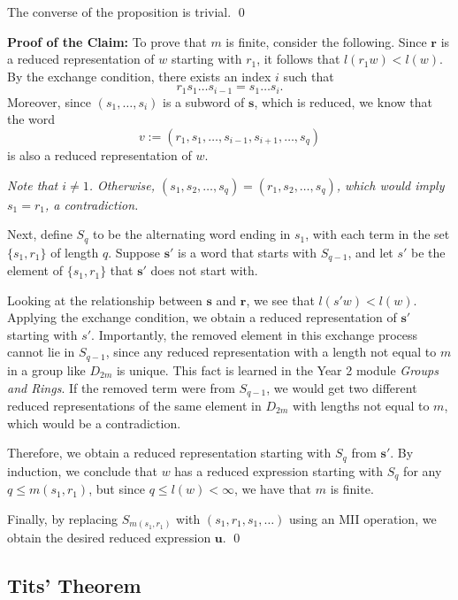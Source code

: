 \documentclass[../main.tex]{subfiles}
\begin{document}
The converse of the proposition is trivial. \qed

\vspace{\baselineskip}

\noindent \textbf{Proof of the Claim:} To prove that \( m \) is finite, consider the following. Since \( \mathbf{r} \) is a reduced representation of \( w \) starting with \( r_1 \), it follows that \( l(r_1 w) < l(w) \). By the exchange condition, there exists an index \( i \) such that
\[
r_1 s_1 \dots s_{i-1} = s_1 \dots s_i.
\]
Moreover, since \( (s_1, \dots, s_i) \) is a subword of \( \mathbf{s} \), which is reduced, we know that the word 
\[
v := (r_1, s_1, \dots, s_{i-1}, s_{i+1}, \dots, s_q)
\]
is also a reduced representation of \( w \).

\textit{Note that \( i \neq 1 \). Otherwise, \( (s_1, s_2, \dots, s_q) = (r_1, s_2, \dots, s_q) \), which would imply \( s_1 = r_1 \), a contradiction.}

Next, define \( S_q \) to be the alternating word ending in \( s_1 \), with each term in the set \( \{ s_1, r_1 \} \) of length \( q \). Suppose \( \mathbf{s'} \) is a word that starts with \( S_{q-1} \), and let \( s' \) be the element of \( \{ s_1, r_1 \} \) that \( \mathbf{s'} \) does not start with.

Looking at the relationship between \( \mathbf{s} \) and \( \mathbf{r} \), we see that \( l(s' w) < l(w) \). Applying the exchange condition, we obtain a reduced representation of \( \mathbf{s'} \) starting with \( s' \). Importantly, the removed element in this exchange process cannot lie in \( S_{q-1} \), since any reduced representation with a length not equal to \( m \) in a group like \( D_{2m} \) is unique. This fact is learned in the Year 2 module \textit{Groups and Rings}. If the removed term were from \( S_{q-1} \), we would get two different reduced representations of the same element in \( D_{2m} \) with lengths not equal to \( m \), which would be a contradiction.

Therefore, we obtain a reduced representation starting with \( S_q \) from \( \mathbf{s'} \). By induction, we conclude that \( w \) has a reduced expression starting with \( S_q \) for any \( q \leq m(s_1, r_1) \), but since \( q \leq l(w) < \infty \), we have that \( m \) is finite.

Finally, by replacing \( S_{m(s_1, r_1)} \) with \( (s_1, r_1, s_1, \dots) \) using an MII operation, we obtain the desired reduced expression \( \mathbf{u} \). \qed

\subsection{Tits' Theorem}
\end{document}
